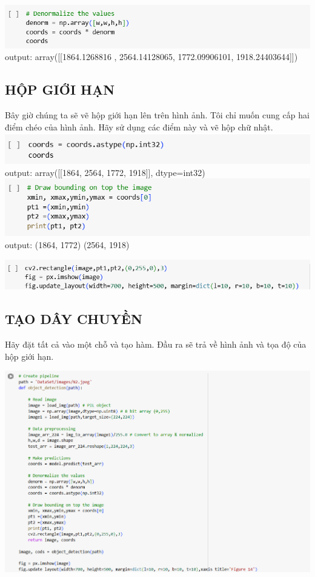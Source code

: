 \documentclass{article}
\begin{document}
\includegraphics[width= 17cm]{img/img1/14.png}\\

output: array([[1864.1268816 , 2564.14128065, 1772.09906101, 1918.24403644]])



\subsection{HỘP GIỚI HẠN}
Bây giờ chúng ta sẽ vẽ hộp giới hạn lên trên hình ảnh. Tôi chỉ muốn cung cấp hai điểm chéo của hình ảnh. Hãy sử dụng các điểm này và vẽ hộp chữ nhật.\\

\includegraphics[width= 17cm]{img/img1/15.png}\\

output: array([[1864, 2564, 1772, 1918]], dtype=int32)\\

\includegraphics[width= 17cm]{img/img1/16.png}\\

output: (1864, 1772) (2564, 1918)

\includegraphics[width= 17cm]{img/img1/17.png}
\subsection{TẠO DÂY CHUYỀN}
Hãy đặt tất cả vào một chỗ và tạo hàm. Đầu ra sẽ trả về hình ảnh và tọa độ của hộp giới hạn.

\includegraphics[width= 17cm]{img/img1/18.png}
\end{document}
